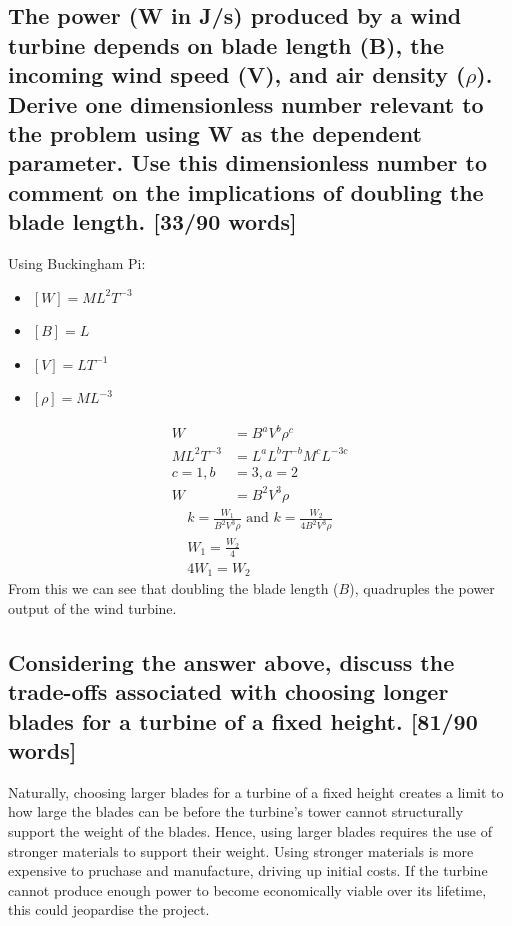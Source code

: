 \documentclass[12pt]{article}
\numberwithin{equation}{section}
\begin{document}
\begin{flushleft}
\subsection[Dimensionless number derivation.]{The power (W in J/s) produced by a wind turbine depends on blade length (B), the incoming wind speed (V), and air density (\(\rho\)). Derive one dimensionless number relevant to the problem using W as the dependent parameter. Use this dimensionless number to comment on the implications of doubling the blade length. [33/90 words]}
Using Buckingham Pi:
\begin{multicols}{2}
  \begin{itemize}
    \item $[W] = ML^2T^{-3}$
    \item $[B] = L$
    \item $[V] = LT^{-1}$
    \item $[\rho] = ML^{-3}$
  \end{itemize}
\end{multicols}
\begin{align}
  W &= B^a V^b \rho^c\\
  ML^2T^{-3} &= L^a L^b T^{-b} M^c L^{-3c}\\
  c = 1, b &= 3, a = 2\\
  W &= B^2 V^3 \rho
\end{align}
\begin{gather}
  k = \frac{W_1}{B^2 V^3 \rho} \textrm{ and } k = \frac{W_2}{4B^2 V^3 \rho}\\
  W_1 = \frac{W_2}{4} \\
  4W_1 = W_2
\end{gather}
From this we can see that doubling the blade length (\(B\)), quadruples the power output of the wind turbine.

\subsection[Trade-offs with longer blade.]{Considering the answer above, discuss the trade-offs associated with choosing longer blades for a turbine of a fixed height. [81/90 words]}
Naturally, choosing larger blades for a turbine of a fixed height creates a limit to how large the blades can be before the turbine’s tower cannot structurally support the weight of the blades. Hence, using larger blades requires the use of stronger materials to support their weight. Using stronger materials is more expensive to pruchase and manufacture, driving up initial costs. If the turbine cannot produce enough power to become economically viable over its lifetime, this could jeopardise the project.


\end{flushleft}
\end{document}
